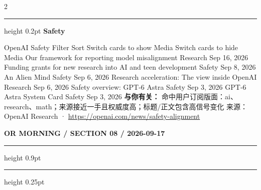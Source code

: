 \documentclass[10.5pt]{ctexart}
\begin{document}
\begin{multicols}{2}
\hrule height 0.2pt
\vspace{2mm}
{\large\bfseries Safety}\par
OpenAI Safety Filter Sort Switch cards to show Media Switch cards to hide Media Our framework for reporting model misalignment Research Sep 16, 2026 Funding grants for new research into AI and teen development Safety Sep 8, 2026 An Alien Mind Safety Sep 6, 2026 Research acceleration: The view inside OpenAI Research Sep 6, 2026 Safety overview: GPT-6 Astra Safety Sep 3, 2026 GPT‑6 Astra System Card Safety Sep 3, 2026 
\textbf{与你有关：} 命中用户订阅版面：ai、research、math；来源接近一手且权威度高；标题/正文包含高信号变化
{\footnotesize\color{ormuted} 来源：OpenAI Research · \url{https://openai.com/news/safety-alignment}}
\end{multicols}
\newpage
{\small\bfseries OR MORNING / SECTION 08 / 2026-09-17}
\vspace{2mm}
\hrule height 0.9pt
\vspace{1.5mm}
\hrule height 0.25pt
\vspace{4mm}
\end{document}
